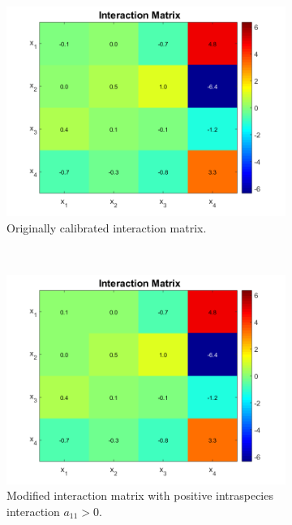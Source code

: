 \documentclass[3p,times]{article}
\begin{document}
\begin{figure}[h]
\begin{subfigure}[b]{0.32\textwidth}
	\includegraphics[width=\textwidth]{Stability/Interactions_parameters_Dumont}
	\caption{Originally calibrated interaction matrix.}
	\label{Interaction_1}
\end{subfigure}
~
\begin{subfigure}[b]{0.32\textwidth}
	\includegraphics[width=\textwidth]{Stability/Interactions_parameters_modified}
	\caption{Modified interaction matrix with positive intraspecies interaction $a_{11}>0$.}
	\label{Interaction_2}
\end{subfigure}
~
\begin{subfigure}[b]{0.32\textwidth}

\end{subfigure}
\end{figure}
\end{document}
